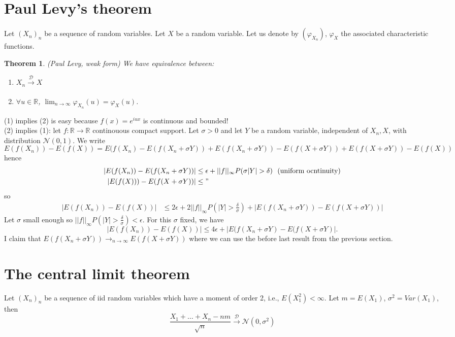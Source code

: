 \documentclass[10pt,a4paper]{book}
\newcommand{\R}{\mathbb{R}}
\newtheorem{theorem}{Theorem}[section]
\theoremstyle{definition}
\begin{document}
\section{Paul Levy's theorem}
Let $(X_n)_n$ be a sequence of random variables. Let $X$ be a random variable. Let us denote by $(\varphi_{X_n})$, $\varphi_X$ the associated characteristic functions.  
\begin{theorem}(Paul Levy, weak form)
We have equivalence between:
\begin{enumerate}
\item $X_n\xrightarrow[]{\mathcal{D}} X$
\item $\forall u\in\R$, $\lim_{n\to\infty}\varphi_{X_n}(u)=\varphi_X(u)$.
\end{enumerate}
\end{theorem}
\proof (1) implies (2) is easy because $f(x)=e^{iux}$ is continuous and bounded!\\
(2) implies (1): let $f:\R\to \R$ continouous compact support. Let $\sigma >0$ and let $Y$ be a random variable, independent of $X_n,X$, with distribution $\mathcal{N}(0,1)$. We write 
$$E(f(X_n))-E(f(X))=E(f(X_n)-E(f(X_n+\sigma Y))+E(f(X_n+\sigma Y))-E(f(X+\sigma Y))+E(f(X+\sigma Y))-E(f(X))$$
hence 
\begin{align*}|E(f(X_n))-E(f(X_n+\sigma Y))|&\leq \epsilon+||f||_{\infty}P(\sigma |Y|>\delta)\,\,\,\,(\text{uniform ocntinuity})\\
|E(f(X)))-E(f(X+\sigma Y))|&\leq "
\end{align*}
so 
\begin{align*}
|E(f(X_n))-E(f(X))|&\leq 2\epsilon +2||f||_{\infty}P(|Y|>\frac{\delta}{\sigma})+|E(f(X_n+\sigma Y))-E(f(X+\sigma Y))|
\end{align*}
Let $\sigma$ small enough so $||f||_{\infty}P(|Y|>\frac{\delta}{\sigma})<\epsilon$. For this $\sigma $ fixed, we have
$$|E(f(X_n))-E(f(X))|\leq 4\epsilon+|E(f(X_n+\sigma Y)-E(f(X+\sigma Y)|.$$
I claim that $E(f(X_n+\sigma Y))\to_{n\to\infty}E(f(X+\sigma Y))$ where we can use the before last result from the previous section.


\section{The central limit theorem} Let $(X_n)_n$ be a sequence of iid random variables which have a moment of order 2, i.e., $E(X_1^2)<\infty$. Let $m=E(X_1)$, $\sigma^2=Var(X_1)$, then 
$$\frac{X_1+\ldots +X_n-nm}{\sqrt{n}}\xrightarrow[]{\mathcal{D}}\mathcal{N}(0,\sigma^2)$$
\end{document}
